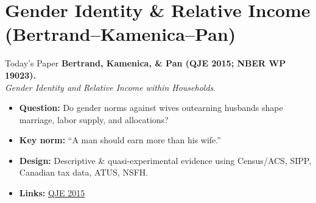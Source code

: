 \documentclass[11pt,notes=hide,aspectratio=169,mathserif]{beamer}
\begin{document}

\section{Gender Identity \& Relative Income (Bertrand--Kamenica--Pan)}

\begin{frame}{Today's Paper}
\textbf{Bertrand, Kamenica, \& Pan (QJE 2015; NBER WP 19023).}\\
\emph{Gender Identity and Relative Income within Households}.\\[0.5em]
\small
\begin{itemize}
  \item \textbf{Question:} Do gender norms against wives outearning husbands shape marriage, labor supply, and allocations?
  \item \textbf{Key norm:} ``A man should earn more than his wife.''
  \item \textbf{Design:} Descriptive \& quasi-experimental evidence using Census/ACS, SIPP, Canadian tax data, ATUS, NSFH.
  \item \textbf{Links:} \href{https://academic.oup.com/qje/article-abstract/130/2/571/2330321}{QJE 2015}
\end{itemize}
\end{frame}
\end{document}
